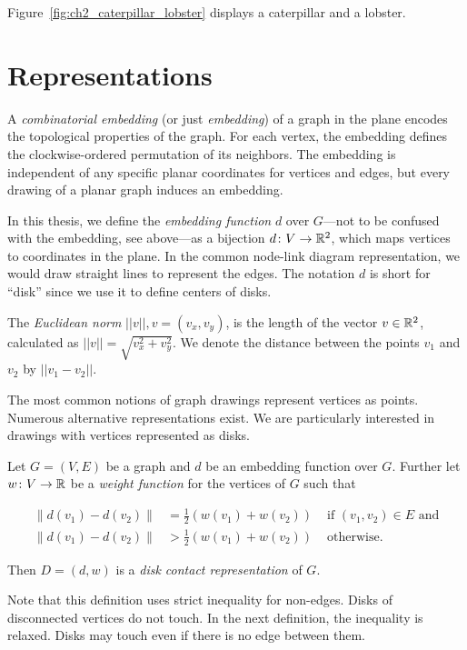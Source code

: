 Figure~\ref{fig:ch2_caterpillar_lobster} displays a caterpillar and a lobster.

\section{Representations}

A \emph{combinatorial embedding} (or just \emph{embedding}) of a graph in the plane encodes the topological properties of the graph. For each vertex, the embedding defines the clockwise-ordered permutation of its neighbors. The embedding is independent of any specific planar coordinates for vertices and edges, but every drawing of a planar graph induces an embedding.

In this thesis, we define the \emph{embedding function} $d$ over $G$---not to be confused with the embedding, see above---as a bijection $d\colon V \to \mathbb R^2$, which maps vertices to coordinates in the plane. In the common node-link diagram representation, we would draw straight lines to represent the edges. The notation $d$ is short for ``disk'' since we use it to define centers of disks.

The \emph{Euclidean norm} $||v||, v = (v_x, v_y)$, is the length of the vector $v \in \mathbb R^2$, calculated as $||v|| = \sqrt{v_x^2 + v_y^2}$. We denote the distance between the points $v_1$ and $v_2$ by $||v_1 - v_2||$.

The most common notions of graph drawings represent vertices as points. Numerous alternative representations exist. We are particularly interested in drawings with vertices represented as disks.

\begin{definition}
\label{def:ch2_DCR}
Let $G = (V, E)$ be a graph and $d$ be an embedding function over $G$. Further let $w\colon V \to \mathbb R$ be a \emph{weight function} for the vertices of $G$ such that

\begin{align*}
\lVert d(v_1) - d(v_2) \rVert &= \frac12(w(v_1) + w(v_2)) &\text{ if } (v_1, v_2) \in E \text{ and} \\ \lVert d(v_1) - d(v_2) \rVert &> \frac12(w(v_1) + w(v_2)) &\text{ otherwise.}
\end{align*}

Then $D = (d, w)$ is a \emph{disk contact representation} of $G$.
\end{definition}

Note that this definition uses strict inequality for non-edges. Disks of disconnected vertices do not touch. In the next definition, the inequality is relaxed. Disks may touch even if there is no edge between them.

